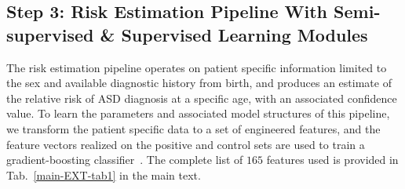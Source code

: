 \documentclass[3p,super,numbers,sort&compress,preprint,10pt]{elsarticle}
\gdef\treatment{positive\xspace}
\begin{document}
\subsection{Step 3: Risk Estimation Pipeline With Semi-supervised \& Supervised Learning Modules}
The risk estimation pipeline operates on patient specific information limited to the sex and available  diagnostic history from birth, and produces an estimate of the relative risk of ASD diagnosis at a specific age, with an associated  confidence value. To learn the parameters and associated model structures of  this pipeline, we transform the patient specific data to a set of engineered features, and the feature vectors realized on the
\treatment and control sets are  used to train a gradient-boosting classifier~\cite{gbm02}. The complete list of $165$ features used  is provided in Tab.~\ref{main-EXT-tab1} in the main text.
\end{document}
